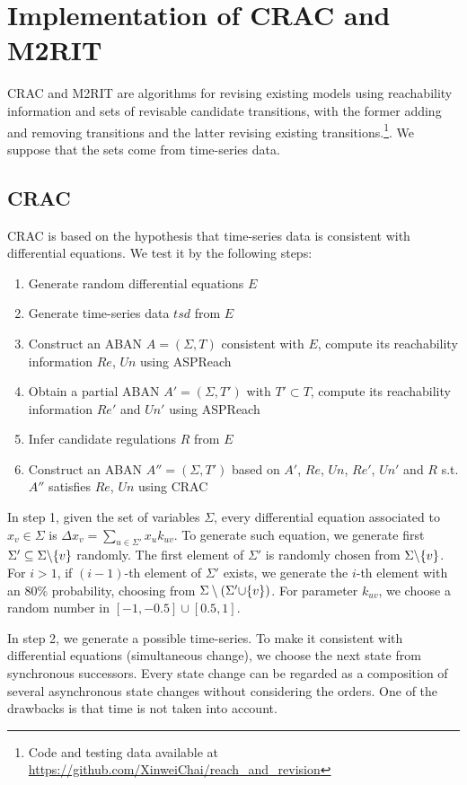 \section{Implementation of CRAC and M2RIT}
CRAC and M2RIT are algorithms for revising existing models using reachability information and sets of revisable candidate transitions, with the former adding and removing transitions and the latter revising existing transitions.\footnote{Code and testing data available at \url{https://github.com/XinweiChai/reach_and_revision}}.
We suppose that the sets come from time-series data.

\subsection{CRAC}
CRAC is based on the hypothesis that time-series data is consistent with differential equations.
We test it by the following steps:
\begin{enumerate}
    \item Generate random differential equations $E$
    \item Generate time-series data $tsd$ from $E$
    \item Construct an ABAN $A=(\Sigma, T)$ consistent with $E$, compute its reachability information $Re$, $Un$ using ASPReach
    \item Obtain a partial ABAN $A'=(\Sigma, T')$ with $T'\subset T$, compute its reachability information $Re'$ and $Un'$ using ASPReach
    \item Infer candidate regulations $R$ from $E$
    \item Construct an ABAN $A''=(\Sigma, T')$ based on $A'$, $Re$, $Un$, $Re'$, $Un'$ and $R$ s.t. $A''$ satisfies $Re$, $Un$ using CRAC
\end{enumerate}


In step 1, given the set of variables $\Sigma$, every differential equation associated to $x_v\in \Sigma$ is $\Delta x_v=\sum_{u\in \Sigma'}x_u k_{uv}$. 
To generate such equation, we generate first $\Sigma'\subseteq \Sigma\miset{v}$ randomly.
The first element of $\Sigma'$ is randomly chosen from $\Sigma\miset{v}$.
For $i>1$, if $(i-1)$-th element of $\Sigma'$ exists, we generate the $i$-th element with an 80\% probability, choosing from $\Sigma\setminus(\Sigma'\addset{v})$.
For parameter $k_{uv}$, we choose a random number in $[-1,-0.5]\cup[0.5,1]$.

In step 2, we generate a possible time-series.
To make it consistent with differential equations (simultaneous change), we choose the next state from synchronous successors.
Every state change can be regarded as a composition of several asynchronous state changes without considering the orders.
One of the drawbacks is that time is not taken into account.

